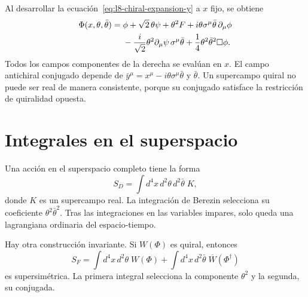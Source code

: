 Al desarrollar la ecuación~\eqref{eq:l8-chiral-expansion-y} a \(x\) fijo, se obtiene
\begin{align}
\Phi(x,\theta,\bar\theta)
={}&\phi
+\sqrt2\,\theta\psi
+\theta^2F
+i\theta\sigma^\mu\bar\theta\,\partial_\mu\phi
\notag\\
&-\frac{i}{\sqrt2}\theta^2
\partial_\mu\psi\,\sigma^\mu\bar\theta
+\frac14\theta^2\bar\theta^2\Box\phi.
\label{eq:l8-chiral-expansion-x}
\end{align}
Todos los campos componentes de la derecha se evalúan en \(x\). El campo antichiral conjugado depende de
\(\bar y^\mu=x^\mu-i\theta\sigma^\mu\bar\theta\) y \(\bar\theta\). Un supercampo quiral no puede ser real de manera consistente, porque su conjugado satisface la restricción de quiralidad opuesta.

\section{Integrales en el superspacio}

Una acción en el superspacio completo tiene la forma
\begin{equation}
S_D=\int d^4x\,d^2\theta\,d^2\bar\theta\;K,
\label{eq:l8-D-term-action}
\end{equation}
donde \(K\) es un supercampo real. La integración de Berezin selecciona su coeficiente \(\theta^2\bar\theta^2\). Tras las integraciones en las variables impares, solo queda una lagrangiana ordinaria del espacio-tiempo.

Hay otra construcción invariante. Si \(W(\Phi)\) es quiral, entonces
\begin{equation}
S_F=\int d^4x\,d^2\theta\;W(\Phi)
+\int d^4x\,d^2\bar\theta\;\overline{W}(\Phi^\dagger)
\label{eq:l8-F-term-action}
\end{equation}
es supersimétrica. La primera integral selecciona la componente \(\theta^2\) y la segunda, su conjugada.

\begin{classroomqa}
\end{classroomqa}

